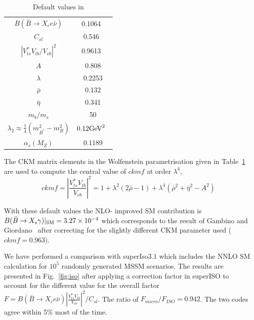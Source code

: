 \documentclass[12pt,a4paper]{article}
\begin{document}
\begin{table}
\begin{center}
\begin{tabular}{|c|c|}
\hline
$B(\bar{B}\rightarrow X_c e\bar\nu)$ & 0.1064~\cite{Nakamura:2010zzi}\\
$C_{sl}$ & 0.546~\cite{Gambino:2008fj}\\
$|V_{ts}^*V_{tb}/V_{cb}|^2$ & 0.9613~\cite{Nakamura:2010zzi}\\
$A$& 0.808\\
$\lambda$ & 0.2253\\
$\bar{\rho}$ & 0.132\\
$\bar{\eta}$ &0.341 \\
$m_b/m_s$  & 50\\
$\lambda_2\approx \frac{1}{4} (m^2_{B^*}-m^2_B)$ &  $0.12 {\rm GeV}^2$~\cite{Yao:2006px}\\
$\alpha_s(M_Z)$ &0.1189 \\\hline
\end{tabular}
\caption{Default values in \micro }
\label{tab:def}
\end{center}
\end{table}

The CKM matrix elements in the Wolfenstein parametrisation given in Table~\ref{tab:def}
are used to compute the central value of $ckmf$  at order $\lambda^4$,
\begin{equation}
ckmf=\left|\frac{V_{ts}^*V_{tb}}{V_{cb}}\right|^2=1+\lambda^2 (2\bar{\rho}-1) +
\lambda^4 (\bar\rho^2+\bar\eta^2-A^2)
\end{equation}

With these default values  the NLO- improved SM contribution 
is $B(\bar{B}\rightarrow X_s \gamma)|_{\rm SM}=3.27\times 10^{-4}$ which corresponds to the result of Gambino
and Giordano~\cite{Gambino:2008fj} after correcting for the slightly different CKM parameter used ($ckmf=0.963$).

We have performed a comparison with superIso$3.1$ which includes the NNLO SM calculation for 
$10^5$ randomly generated MSSM scenarios. The results are presented in Fig.~\ref{fig:iso}  after applying a
correction factor in superISO to account for the different value for the overall factor
$F=B(\bar{B}\rightarrow X_c e\bar\nu) \left|\frac{V_{ts}^* V_{tb}}
{V_{cb}}\right|^2/C_{sl}$. The ratio of $F_{micro}/F_{ISO}=0.942$.
The two codes agree within 5\% most of the time. 
\end{document}
